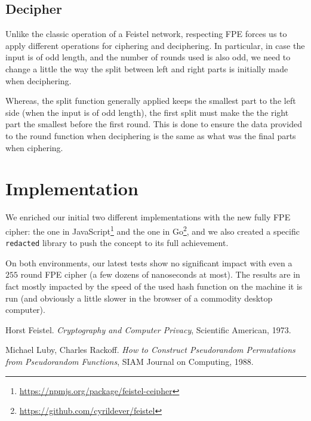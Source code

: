 \documentclass[twoside,twocolumn]{article}
\theoremstyle{definition}
\theoremstyle{remark}
\begin{document}
\subsection{Decipher}

Unlike the classic operation of a Feistel network, respecting FPE forces us to apply different operations for ciphering and deciphering. In particular, 
in case the input is of odd length, and the number of rounds used is also odd, we need to change a little the way the split between left and right 
parts is initially made when deciphering.

Whereas, the split function generally applied keeps the smallest part to the left side (when the input is of odd length), the first split must make the 
the right part the smallest before the first round. This is done to ensure the data provided to the round function when deciphering is the same as what 
was the final parts when ciphering.

\section{Implementation}

We enriched our initial two different implementations with the new fully FPE cipher: the one in 
JavaScript\footnote{\url{https://npmjs.org/package/feistel-ceipher}} and the one in Go\footnote{\url{https://github.com/cyrildever/feistel}}, and we 
also created a specific \texttt{redacted} library to push the concept to its full achievement.

On both environments, our latest tests show no significant impact with even a $255$ round FPE cipher (a few dozens of nanoseconds at most). The results 
are in fact mostly impacted by the speed of the used hash function on the machine it is run (and obviously a little slower in the browser of a 
commodity desktop computer).



\begin{thebibliography}{99} %

Horst Feistel. \emph{Cryptography and Computer Privacy}, Scientific American, 1973.

Michael Luby, Charles Rackoff. \emph{How to Construct Pseudorandom Permutations from Pseudorandom Functions}, SIAM Journal on Computing, 1988.

\end{thebibliography}

\end{document}
